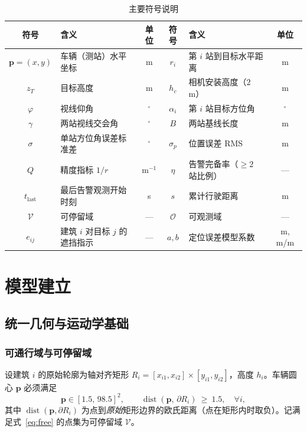 \documentclass[UTF8,a4paper,zihao=-4,oneside]{ctexart}
\begin{document}
\begin{table}[htbp]
  \centering
  \caption{主要符号说明}
  \label{tab:symbol}
  \small
  \begin{tabular}{clc|clc}
    \toprule
    符号 & 含义 & 单位 & 符号 & 含义 & 单位 \\
    \midrule
    $\bm{p}=(x,y)$ & 车辆（测站）水平坐标 & m & $r_i$ & 第 $i$ 站到目标水平距离 & m \\
    $z_T$ & 目标高度 & m & $h_c$ & 相机安装高度（$2$ m） & m \\
    $\varphi$ & 视线仰角 & $^\circ$ & $\alpha_i$ & 第 $i$ 站目标方位角 & $^\circ$ \\
    $\gamma$ & 两站视线交会角 & $^\circ$ & $B$ & 两站基线长度 & m \\
    $\sigma$ & 单站方位角误差标准差 & $^\circ$ & $\sigma_p$ & 位置误差 RMS & m \\
    $Q$ & 精度指标 $1/r$ & $\mathrm{m^{-1}}$ & $\eta$ & 告警完备率（$\ge2$ 站比例） & — \\
    $t_{\mathrm{last}}$ & 最后告警观测开始时刻 & s & $s$ & 累计行驶距离 & m \\
    $\mathcal{V}$ & 可停留域 & — & $\mathcal{O}$ & 可观测域 & — \\
    $e_{ij}$ & 建筑 $i$ 对目标 $j$ 的遮挡指示 & — & $a,b$ & 定位误差模型系数 & m, m/m \\
    \bottomrule
  \end{tabular}
\end{table}

\section{模型建立}

\subsection{统一几何与运动学基础}

\subsubsection{可通行域与可停留域}

设建筑 $i$ 的原始轮廓为轴对齐矩形 $R_i=[x_{i1},x_{i2}]\times[y_{i1},y_{i2}]$，高度 $h_i$。车辆圆心 $\bm{p}$ 必须满足
\begin{equation}
\label{eq:free}
\bm{p}\in[1.5,\,98.5]^2,\qquad
\operatorname{dist}\!\left(\bm{p},\,\partial R_i\right)\ \ge\ 1.5,\quad \forall i,
\end{equation}
其中 $\operatorname{dist}(\bm{p},\partial R_i)$ 为点到\emph{原始}矩形边界的欧氏距离（点在矩形内时取负）。记满足式~\eqref{eq:free} 的点集为可停留域 $\mathcal{V}$。
\end{document}
